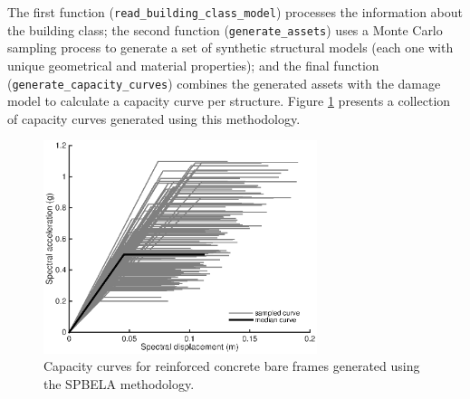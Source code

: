 The first function (\verb=read_building_class_model=) processes the information about the building class; the second function (\verb=generate_assets=) uses a Monte Carlo sampling process to generate a set of synthetic structural models (each one with unique geometrical and material properties); and the final function (\verb=generate_capacity_curves=) combines the generated assets with the damage model to calculate a capacity curve per structure. Figure \ref{fig:SPBELA_cc} presents a collection of capacity curves generated using this methodology.

\begin{figure}[htb]
  \centering
      \includegraphics[width=8cm]{Figures/SPBELA_cc.eps}
  \caption{Capacity curves for reinforced concrete bare frames generated using the SPBELA methodology.}
  \label{fig:SPBELA_cc}
\end{figure}